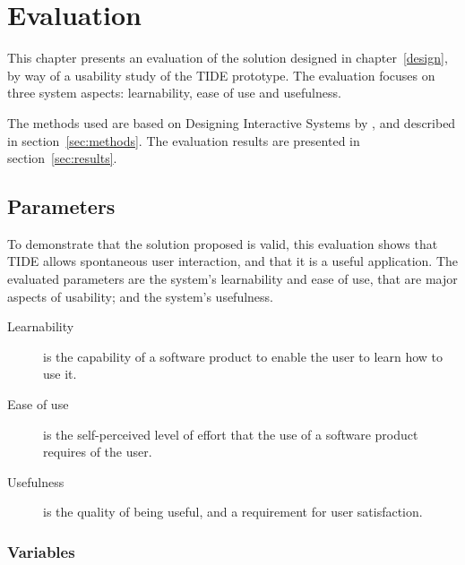 

\chapter{Evaluation}
\label{evaluation}

This chapter presents an evaluation of the solution designed in chapter~\ref{design}, by way of a usability study of the TIDE prototype.
The evaluation focuses on three system aspects: learnability, ease of use and usefulness.

The methods used are based on Designing Interactive Systems by
\cite{Benyon:2010}, and described in section~\ref{sec:methods}.
The evaluation results are presented in section~\ref{sec:results}.

\section{Parameters}
\label{sec:parameters}

To demonstrate that the solution proposed is valid,
this evaluation shows that TIDE allows spontaneous user interaction, and that it is a useful application.
The evaluated parameters are the system's learnability and ease of use, that are major aspects of usability; and the system's usefulness.

\begin{description}
\item[Learnability] is the capability of a software product to enable the user to learn how to use it.

\item[Ease of use] is the self-perceived level of effort that the use of a software product requires of the user.

\item[Usefulness] is the quality of being useful, and a requirement for user satisfaction.

\end{description}

\subsection{Variables}

